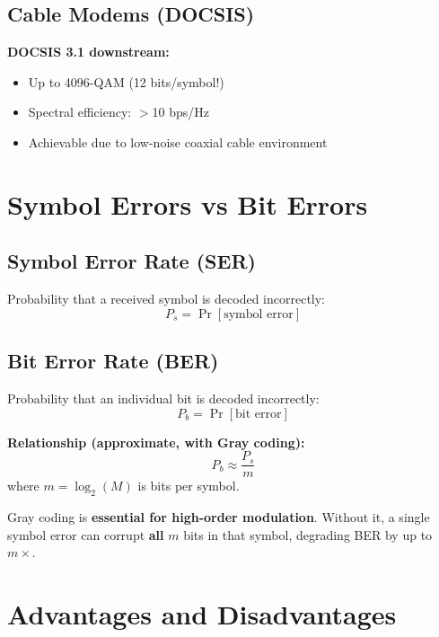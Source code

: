 \subsection{Cable Modems (DOCSIS)}

\textbf{DOCSIS 3.1 downstream:}
\begin{itemize}
\item Up to 4096-QAM (12 bits/symbol!)
\item Spectral efficiency: $>$10 bps/Hz
\item Achievable due to low-noise coaxial cable environment
\end{itemize}

\section{Symbol Errors vs Bit Errors}

\subsection{Symbol Error Rate (SER)}

Probability that a received symbol is decoded incorrectly:
\begin{equation}
P_s = \Pr[\text{symbol error}]
\end{equation}

\subsection{Bit Error Rate (BER)}

Probability that an individual bit is decoded incorrectly:
\begin{equation}
P_b = \Pr[\text{bit error}]
\end{equation}

\textbf{Relationship (approximate, with Gray coding):}
\begin{equation}
P_b \approx \frac{P_s}{m}
\end{equation}
where $m = \log_2(M)$ is bits per symbol.

\begin{warningbox}
Gray coding is \textbf{essential for high-order modulation}. Without it, a single symbol error can corrupt \textbf{all} $m$ bits in that symbol, degrading BER by up to $m\times$.
\end{warningbox}

\section{Advantages and Disadvantages}

